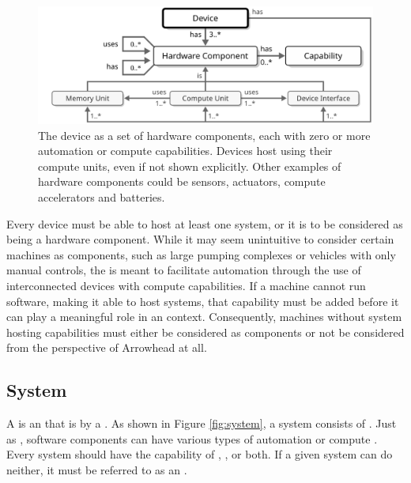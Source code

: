 \vfill

\begin{figure}[ht!]
  \centering
  \includegraphics[scale=0.9]{figures/device}
  \caption{
    The device as a set of hardware components, each with zero or more automation or compute capabilities.
    Devices host  using their compute units, even if not shown explicitly.
    Other examples of hardware components could be sensors, actuators, compute accelerators and batteries.
  }
  \label{fig:device}
\end{figure}

Every device must be able to host at least one system, or it is to be considered as being a hardware component.
While it may seem unintuitive to consider certain machines as components, such as large pumping complexes or vehicles with only manual controls, the  is meant to facilitate automation through the use of interconnected devices with compute capabilities.
If a machine cannot run software, making it able to host systems, that capability must be added before it can play a meaningful role in an  context.
Consequently, machines without system hosting capabilities must either be considered as components or not be considered from the perspective of Arrowhead at all.

\newpage

\subsection{System}
\label{sec:concepts:system}

A  is an   that is  by a .
As shown in Figure \ref{fig:system}, a system consists of .
Just as , software components can have various types of automation or compute .
Every system should have the capability of , , or both.
If a given system can do neither, it must be referred to as an .


